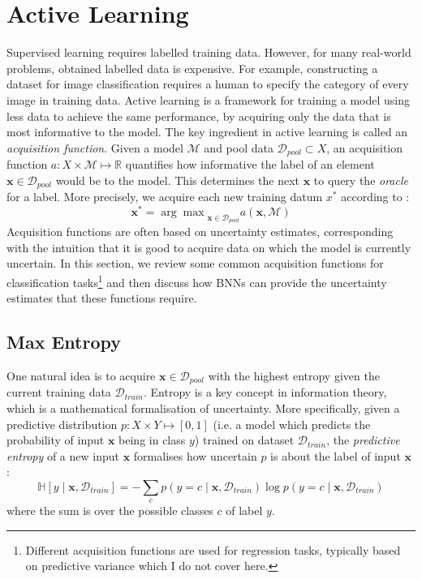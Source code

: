 \documentclass[11pt, a4paper, bibliography=totoc]{report}
\newcommand{\reals}{\mathbb{R}}
\newcommand{\data}{\mathcal{D}}
\newcommand{\entropy}[1]{\mathbb{H} \left[ #1 \right] }
\newcommand{\x}{\mathbf{x}}
\begin{document}
\section{Active Learning}
Supervised learning requires labelled training data. However, for many real-world problems, obtained labelled data is expensive. For example, constructing a dataset for image classification requires a human to specify the category of every image in training data. Active learning \cite{cohn1996active} is a framework for training a model using less data to achieve the same performance, by acquiring only the data that is most informative to the model. The key ingredient in active learning is called an \textit{acquisition function}. Given a model $ \mathcal{M} $ and pool data $ \mathcal{D}_{pool} \subset X $, an acquisition function $ a : X \times \mathcal{M} \mapsto \reals $ quantifies how informative the label of an element $ \x \in \mathcal{D}_{pool} $ would be to the model. This determines the next $ \x $ to query the \textit{oracle} for a label. More precisely, we acquire each new training datum $ x^* $ according to \cite{Gal2017b}:
\[ \x^* = {\arg\max}_{\x \in \mathcal{D}_{pool}} a(\x, \mathcal{M}) \]
Acquisition functions are often based on uncertainty estimates, corresponding with the intuition that it is good to acquire data on which the model is currently uncertain. In this section, we review some common acquisition functions for classification tasks\footnote{Different acquisition functions are used for regression tasks, typically based on predictive variance \cite[p.~47]{Gal2017a} which I do not cover here.} and then discuss how BNNs can provide the uncertainty estimates that these functions require. %

\subsection{Max Entropy} \label{sec:max_ent}
One natural idea is to acquire $ \x \in \data_{pool} $ with the highest entropy \cite{shannon1948mathematical} given the current training data $ \data_{train} $. Entropy is a key concept in information theory, which is a mathematical formalisation of uncertainty. More specifically, given a predictive distribution $ p : X \times Y \mapsto [0,1] $ (i.e. a model which predicts the probability of input $ \x $ being in class $ y $) trained on dataset $ \data_{train} $, the \textit{predictive entropy} of a new input $ \x $ formalises how uncertain $ p $ is about the label of input $ \x $ \cite[p.~52]{Gal2017a}:
\begin{equation}\label{eq:entropy}
\entropy{y \mid \x, \data_{train}} = -\sum_{c} p(y=c \mid \x, \data_{train} ) \log p(y=c \mid \x, \data_{train} )
\end{equation} %
where the sum is over the possible classes $ c $ of label $ y $.
\end{document}
